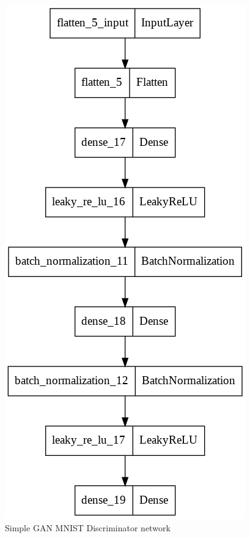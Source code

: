 \documentclass[conference]{IEEEtran}
\begin{document}
\begin{itemize}
    \begin{figure}[h]
    \centering
    \includegraphics[scale = 0.3]{dGAN_MNIST_disc_model.png}
      \caption{Simple GAN MNIST Discriminator network}
    \end{figure}
    

\end{itemize}
\end{document}

